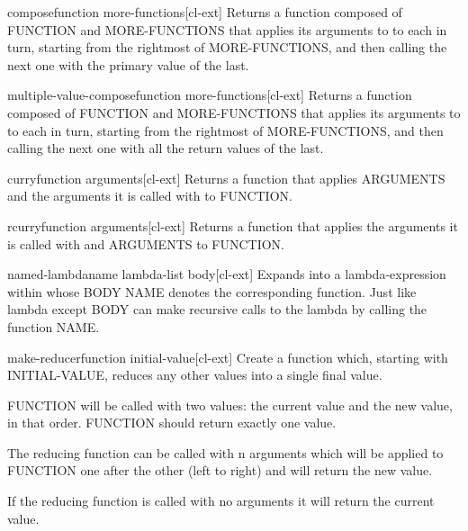 \documentclass[10pt,english]{book}
\begin{document}
\begin{function}{compose}{function \rest more-functions}[cl-ext]
  Returns a function composed of FUNCTION and MORE-FUNCTIONS that applies its
arguments to to each in turn, starting from the rightmost of MORE-FUNCTIONS,
and then calling the next one with the primary value of the last.
\end{function}

\begin{function}{multiple-value-compose}{function \rest more-functions}[cl-ext]
  Returns a function composed of FUNCTION and MORE-FUNCTIONS that applies
its arguments to to each in turn, starting from the rightmost of
MORE-FUNCTIONS, and then calling the next one with all the return values of
the last.
\end{function}

\begin{function}{curry}{function \rest arguments}[cl-ext]
  Returns a function that applies ARGUMENTS and the arguments
it is called with to FUNCTION.
\end{function}

\begin{function}{rcurry}{function \rest arguments}[cl-ext]
  Returns a function that applies the arguments it is called
with and ARGUMENTS to FUNCTION.
\end{function}

\begin{macro}{named-lambda}{name lambda-list \body body}[cl-ext]
  Expands into a lambda-expression within whose BODY NAME denotes the
  corresponding function. Just like lambda except BODY can make recursive
  calls to the lambda by calling the function NAME.
\end{macro}

\begin{function}{make-reducer}{function \op initial-value}[cl-ext]
  Create a function which, starting with INITIAL-VALUE, reduces
any other values into a single final value.

FUNCTION will be called with two values: the current value and
the new value, in that order. FUNCTION should return exactly one
value.

The reducing function can be called with n arguments which will
be applied to FUNCTION one after the other (left to right) and
will return the new value.

If the reducing function is called with no arguments it will
return the current value.
\end{function}
\end{document}
